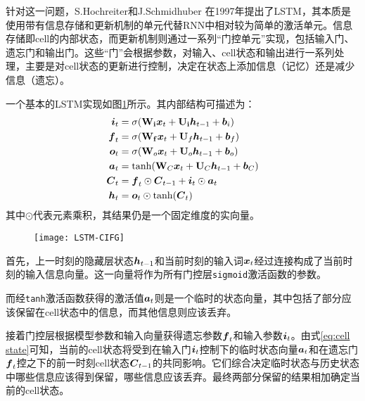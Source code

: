 针对这一问题，S.Hochreiter和J.Schmidhuber\citep{hochreiter1997long} 在1997年提出了LSTM，其本质是使用带有信息存储和更新机制的单元代替RNN中相对较为简单的激活单元。信息存储即cell的内部状态，而更新机制则通过一系列“门控单元”实现，包括输入门、遗忘门和输出门。这些“门”会根据参数，对输入、cell状态和输出进行一系列处理，主要是对cell状态的更新进行控制，决定在状态上添加信息（记忆）还是减少信息（遗忘）。

一个基本的LSTM实现如图\ref{fig:LSTM}所示。其内部结构可描述为：
\begin{align}
\boldsymbol{i}_t &= \sigma(\boldsymbol{\mathbf{W_i}}\boldsymbol{x}_t + \boldsymbol{\mathbf{U_i}}\boldsymbol{h}_{t-1} + \boldsymbol{b}_i)
    \label{eq:lstm_i}\\
\boldsymbol{f}_t &= \sigma(\boldsymbol{\mathbf{W_f}}\boldsymbol{x}_t + \boldsymbol{\mathbf{U}}_f\boldsymbol{h}_{t-1} + \boldsymbol{b}_f)\\
    \boldsymbol{o}_t &= \sigma(\boldsymbol{\mathbf{W}}_o\boldsymbol{x}_t + \boldsymbol{\mathbf{U}}_o\boldsymbol{h}_{t-1} + \boldsymbol{b}_o)\\
    \boldsymbol{a}_t &= \tanh(\boldsymbol{\mathbf{W}}_C\boldsymbol{x}_t + \boldsymbol{\mathbf{U}}_C\boldsymbol{h}_{t-1} + \boldsymbol{b}_C)\\
    \boldsymbol{C}_t &= \boldsymbol{f}_t\odot\boldsymbol{C}_{t-1} +
                    \boldsymbol{i}_t\odot\boldsymbol{a}_t
                    \label{eq:cell state}\\
    \boldsymbol{h}_t &= \boldsymbol{o}_t \odot \tanh(\boldsymbol{C}_t)\label{eq:lstm_C}
\end{align}
其中$\odot$代表元素乘积，其结果仍是一个固定维度的实向量。

\begin{figure}[H]
    \centering
    \texttt{[image: LSTM-CIFG]}
    \label{fig:LSTM}
\end{figure}

首先，上一时刻的隐藏层状态$\boldsymbol{h}_{t-1}$和当前时刻的输入词$\boldsymbol{x}_t$经过连接构成了当前时刻的输入信息向量。这一向量将作为所有门控层\verb|sigmoid|激活函数的参数。

而经\verb|tanh|激活函数获得的激活值$\boldsymbol{a}_t$则是一个临时的状态向量，其中包括了部分应该保留在cell状态中的信息，而其他信息则应该丢弃。

接着门控层根据模型参数和输入向量获得遗忘参数$\boldsymbol{f}_t$和输入参数$\boldsymbol{i}_t$。由式\ref{eq:cell state}可知，当前的cell状态将受到在输入门$\boldsymbol{i}_t$控制下的临时状态向量$\boldsymbol{a}_t$和在遗忘门$\boldsymbol{f}_t$控之下的前一时刻cell状态$\boldsymbol{C}_{t-1}$的共同影响。它们综合决定临时状态与历史状态中哪些信息应该得到保留，哪些信息应该丢弃。最终两部分保留的结果相加确定当前的cell状态。


